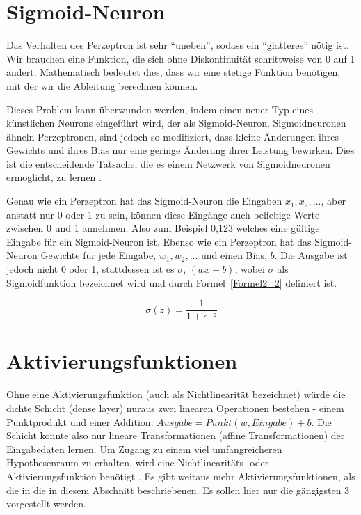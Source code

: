 \section{Sigmoid-Neuron}
Das Verhalten des Perzeptron ist sehr  \enquote{uneben}, sodass ein \enquote{glatteres} nötig ist. Wir brauchen eine Funktion, die sich ohne Diskontinuität schrittweise von 0 auf 1 ändert. Mathematisch bedeutet dies, dass wir eine stetige Funktion benötigen, mit der wir die Ableitung berechnen können.

Dieses Problem kann überwunden werden, indem einen neuer Typ eines künstlichen Neurons eingeführt wird, der als Sigmoid-Neuron. Sigmoidneuronen ähneln Perzeptronen, sind jedoch so modifiziert, dass kleine Änderungen ihres Gewichts und ihres Bias nur eine geringe Änderung ihrer Leistung bewirken. Dies ist die entscheidende Tatsache, die es einem Netzwerk von Sigmoidneuronen ermöglicht, zu lernen \cite*[8]{Nielsen2015}.

Genau wie ein Perzeptron hat das Sigmoid-Neuron die Eingaben $x_1, x_2, ...$, aber anstatt nur 0 oder 1 zu sein, können diese Eingänge auch beliebige Werte zwischen 0 und 1 annehmen. Also zum Beispiel 0,123 welches eine gültige Eingabe für ein Sigmoid-Neuron ist. Ebenso wie ein Perzeptron hat das Sigmoid-Neuron Gewichte für jede Eingabe, $w_1, w_2, ...$ und einen Bias, $b$. Die Ausgabe ist jedoch nicht 0 oder 1, stattdessen ist es $\sigma$, $(wx + b)$, wobei $\sigma$ als Sigmoidfunktion bezeichnet wird und durch Formel~\ref{Formel2_2} definiert ist.

\begin{equation} \label{Formel2_2}
    \sigma (z) = \frac{1}{1+e^{-z}}
\end{equation}


\section{Aktivierungsfunktionen}
Ohne eine Aktivierungsfunktion (auch als Nichtlinearität bezeichnet) würde die dichte Schicht (dense layer) nuraus zwei linearen Operationen bestehen - einem Punktprodukt und einer Addition: $Ausgabe = Punkt (w, Eingabe) + b$. Die Schicht konnte also nur lineare Transformationen (affine Transformationen) der Eingabedaten lernen. Um Zugang zu einem viel umfangreicheren Hypothesenraum zu erhalten, wird eine Nichtlinearitäts- oder Aktivierungsfunktion benötigt \cite*[S. 72]{Chollet2017}. Es gibt weitaus mehr Aktivierungsfunktionen, als die in die in diesem Abschnitt beschriebenen. Es sollen hier nur die gängigsten 3 vorgestellt werden.

